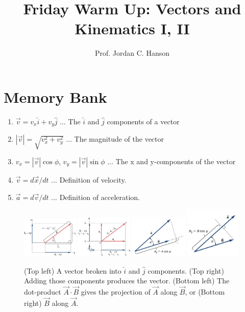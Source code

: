 \documentclass{article}
\begin{document}
\twocolumn

\title{Friday Warm Up: Vectors and Kinematics I, II}
\author{Prof. Jordan C. Hanson}

\maketitle

\section{Memory Bank}

\begin{enumerate}
\item $\vec{v} = v_x \hat{i} + v_y \hat{j}$ ... The $\hat{i}$ and $\hat{j}$ components of a vector
\item $|\vec{v}| = \sqrt{v_x^2 + v_y^2}$ ... The magnitude of the vector
\item $v_x = |\vec{v}| \cos\phi$, $v_y = |\vec{v}| \sin\phi$ ... The x and y-components of the vector
\item $\vec{v} = d\vec{x}/dt$ ... Definition of velocity.
\item $\vec{a} = d\vec{v}/dt$ ... Definition of acceleration.
\end{enumerate}

\begin{figure}
\centering
\includegraphics[width=0.24\textwidth]{figures/vector1.jpeg}
\includegraphics[width=0.24\textwidth]{figures/vector2.jpeg}
\includegraphics[width=0.24\textwidth]{figures/projection_2.png}
\includegraphics[width=0.24\textwidth]{figures/projection_1.png}
\caption{\label{fig:1} (Top left) A vector broken into $\hat{i}$ and $\hat{j}$ components. (Top right) Adding those components produces the vector. (Bottom left) The dot-product $\vec{A} \cdot \vec{B}$ gives the projection of $\vec{A}$ along $\vec{B}$, or (Bottom right) $\vec{B}$ along $\vec{A}$.}
\end{figure}
\end{document}
